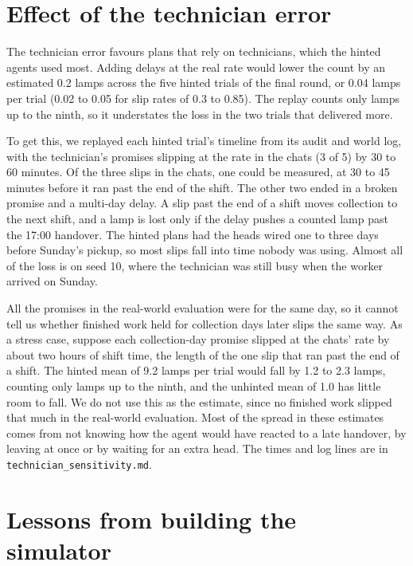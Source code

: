 \documentclass[10pt]{article}
\begin{document}
\section{Effect of the technician error}
\label{app:tech}

The technician error favours plans that rely on technicians, which the hinted agents used most. Adding delays at the real rate would lower the count by an estimated 0.2
lamps across the five hinted trials of the final round, or 0.04 lamps per trial (0.02 to 0.05 for slip rates of 0.3 to 0.85). The replay counts only lamps up to the ninth, so it understates the loss in the two trials that delivered more.

To get this, we replayed each hinted trial's timeline from its audit and world log, with the technician's promises slipping at the
rate in the chats (3 of 5) by 30 to 60 minutes. Of the three slips in the chats, one could be measured, at 30 to 45 minutes before
it ran past the end of the shift. The other two ended in a broken promise and a multi-day delay. A slip past the end of a shift moves
collection to the next shift, and a lamp is lost only if the delay pushes a counted lamp past the 17:00 handover. The hinted plans
had the heads wired one to three days before Sunday's pickup, so most slips fall into time nobody was using. Almost all of the loss
is on seed 10, where the technician was still busy when the worker arrived on Sunday.

All the promises in the real-world evaluation were for the same day, so it cannot tell us whether finished work held for collection
days later slips the same way. As a stress case, suppose each collection-day promise slipped at the chats' rate by about two hours
of shift time, the length of the one slip that ran past the end of a shift. The hinted mean of 9.2 lamps per trial would fall by 1.2 to 2.3 lamps, counting only lamps up to the ninth, and the unhinted mean of 1.0 has little room to fall. We do not use this as the estimate, since no finished work slipped that
much in the real-world evaluation. Most of the spread in these estimates comes from not knowing how the agent would have reacted to
a late handover, by leaving at once or by waiting for an extra head. The times and log lines are in \texttt{technician\_sensitivity.md}.

\section{Lessons from building the simulator}
\label{sec:lessons}
\end{document}
